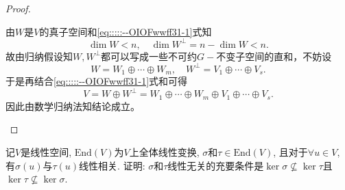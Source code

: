 \documentclass[../../main.tex]{subfiles}%
\begin{document}
\begin{proof}
\begin{enumerate}[(1)]
由$W$是$V$的真子空间和\eqref{eq:::::--OIOFwwff31-1}式知
$$\dim W<n,\quad \dim W^\perp=n-\dim W<n.$$
故由归纳假设知$W,W^\perp$都可以写成一些不可约$G-$不变子空间的直和，不妨设
$$W=W_1\oplus \cdots \oplus W_m,\quad W^\perp=V_1\oplus \cdots \oplus V_s.$$
于是再结合\eqref{eq:::::--OIOFwwff31-1}式和可得
$$V=W\oplus W^\perp=W_1\oplus \cdots \oplus W_m\oplus V_1\oplus \cdots \oplus V_s.$$
因此由数学归纳法知结论成立。
\end{enumerate}
\end{proof}

\begin{example}
记$V$是线性空间, $\mathrm{End}(V)$为$V$上全体线性变换, $\sigma$和$\tau \in \mathrm{End}(V)$, 且对于$\forall u\in V$, 有$\sigma(u)$与$\tau(u)$线性相关.
证明: $\sigma$和$\tau$线性无关的充要条件是$\ker\sigma \nsubseteq \ker\tau$且$\ker\tau \nsubseteq \ker\sigma$.
\end{example}
\end{document}
